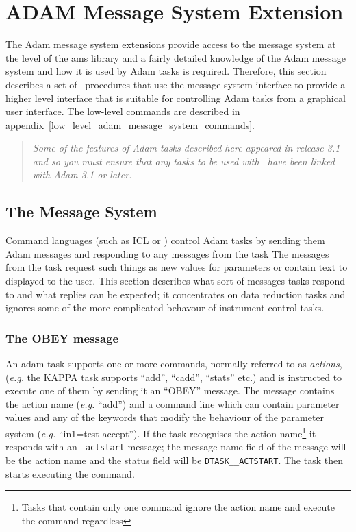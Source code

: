 \section{\label{adam_message_system_extension}ADAM Message System Extension}

The Adam message system extensions provide access to the message system
at the level of the ams library and a fairly detailed knowledge
of the Adam message system and how it is used by Adam tasks is required.
Therefore, this section describes a set of \Tcl\ procedures that use the
message system interface to provide a higher level interface that is
suitable for controlling Adam tasks from a graphical user interface. The
low-level commands are described in
appendix~\ref{low_level_adam_message_system_commands}.

\begin{quote}
{\em Some of the features of Adam tasks described here appeared in release
3.1 and so you must ensure that any tasks to be used with \Tcl\ have been
linked with Adam 3.1 or later.}
\end{quote}

\subsection{\label{message_system}The Message System}

Command languages (such as ICL or \TclTk ) control Adam tasks by
sending them Adam messages and responding to any messages from the task
The messages from the task request such things as new values for
parameters or contain text to displayed to the user.  This section
describes what sort of messages tasks respond to and what replies can
be expected; it concentrates on data reduction tasks and ignores some
of the more complicated behavour of instrument control tasks.

\subsubsection{The OBEY message}

An adam task supports one or more commands, normally referred to as
{\em actions}, ({\em{e.g.}} the KAPPA task supports ``add'', ``cadd'',
``stats'' etc.) and is instructed to execute one of them by sending it
an ``OBEY'' message. The message contains the action name ({\em{e.g.}} ``add'')
and a command line which can contain parameter values and any of the
keywords that modify the behaviour of the parameter system ({\em{e.g.}}
``in1=test accept''). If the task recognises the action
name\footnote{Tasks that contain only one command ignore the action
name and execute the command regardless} it responds with an {\tt
actstart} message; the message name field of the message will be the
action name and the status field will be {\tt DTASK\_\_ACTSTART}. The
task then starts executing the command.

